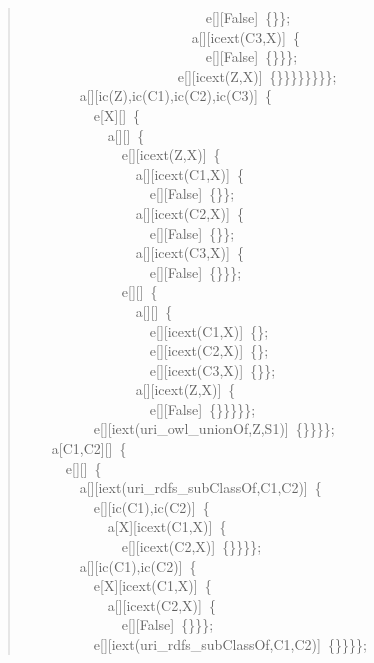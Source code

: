 \begin{quote}
{~~~~~~~~~~~~~~~~~~~~~~~~~~e[][False]~\{\}\};\\
~~~~~~~~~~~~~~~~~~~~~~~~a[][icext(C3,X)]~\{\\
~~~~~~~~~~~~~~~~~~~~~~~~~~e[][False]~\{\}\}\};\\
~~~~~~~~~~~~~~~~~~~~~~e[][icext(Z,X)]~\{\}\}\}\}\}\}\}\};\\
~~~~~~~~a[][ic(Z),ic(C1),ic(C2),ic(C3)]~\{\\
~~~~~~~~~~e[X][]~\{\\
~~~~~~~~~~~~a[][]~\{\\
~~~~~~~~~~~~~~e[][icext(Z,X)]~\{\\
~~~~~~~~~~~~~~~~a[][icext(C1,X)]~\{\\
~~~~~~~~~~~~~~~~~~e[][False]~\{\}\};\\
~~~~~~~~~~~~~~~~a[][icext(C2,X)]~\{\\
~~~~~~~~~~~~~~~~~~e[][False]~\{\}\};\\
~~~~~~~~~~~~~~~~a[][icext(C3,X)]~\{\\
~~~~~~~~~~~~~~~~~~e[][False]~\{\}\}\};\\
~~~~~~~~~~~~~~e[][]~\{\\
~~~~~~~~~~~~~~~~a[][]~\{\\
~~~~~~~~~~~~~~~~~~e[][icext(C1,X)]~\{\};\\
~~~~~~~~~~~~~~~~~~e[][icext(C2,X)]~\{\};\\
~~~~~~~~~~~~~~~~~~e[][icext(C3,X)]~\{\}\};\\
~~~~~~~~~~~~~~~~a[][icext(Z,X)]~\{\\
~~~~~~~~~~~~~~~~~~e[][False]~\{\}\}\}\}\};\\
~~~~~~~~~~e[][iext(uri\_owl\_unionOf,Z,S1)]~\{\}\}\}\};\\
~~~~a[C1,C2][]~\{\\
~~~~~~e[][]~\{\\
~~~~~~~~a[][iext(uri\_rdfs\_subClassOf,C1,C2)]~\{\\
~~~~~~~~~~e[][ic(C1),ic(C2)]~\{\\
~~~~~~~~~~~~a[X][icext(C1,X)]~\{\\
~~~~~~~~~~~~~~e[][icext(C2,X)]~\{\}\}\}\};\\
~~~~~~~~a[][ic(C1),ic(C2)]~\{\\
~~~~~~~~~~e[X][icext(C1,X)]~\{\\
~~~~~~~~~~~~a[][icext(C2,X)]~\{\\
~~~~~~~~~~~~~~e[][False]~\{\}\}\};\\
~~~~~~~~~~e[][iext(uri\_rdfs\_subClassOf,C1,C2)]~\{\}\}\}\};\\
}
\end{quote}
